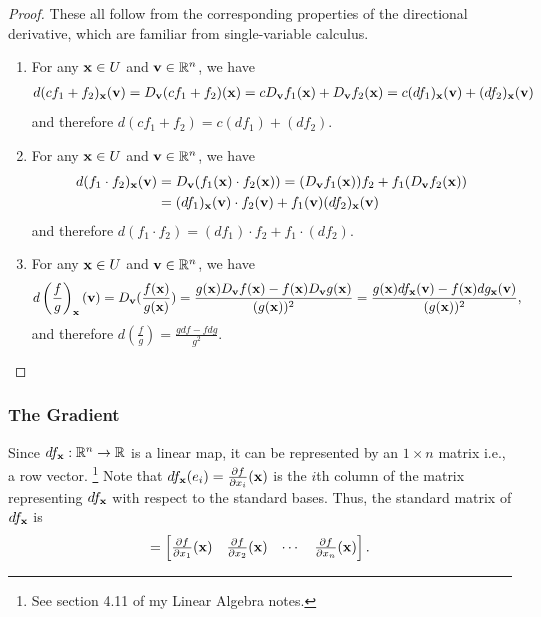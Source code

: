 \documentclass[12pt,letterpaper,reqno]{article}
\numberwithin{equation}{section}
\newcommand{\R}{\ensuremath{\mathbb R}}
\newcommand{\bv}{{\bf v}}
\newcommand{\bx}{{\bf x}}
\begin{document}
{\begin{proof}
These all follow from the corresponding properties of the directional derivative, which are familiar from single-variable calculus.
	\begin{enumerate}[(1)]
		\item For any $\bx \in U$ and $\bv \in \R^n$, we have
		\begin{align*}
			d(cf_1+f_2)_\bx(\bv)=D_\bv(cf_1+f_2)(\bx)=c D_\bv f_1(\bx)+D_\bv f_2(\bx)=c(df_1)_\bx(\bv)+(df_2)_\bx(\bv)
		\end{align*}
		and therefore $d(cf_1+f_2)=c(df_1)+(df_2)$.
		\item For any $\bx \in U$ and $\bv \in \R^n$, we have
		\begin{align*}
			d(f_1 \cdot f_2)_\bx(\bv)&=D_\bv(f_1(\bx) \cdot f_2(\bx))=(D_\bv f_1(\bx))f_2+f_1(D_\bv f_2(\bx))\\
			&=(df_1)_\bx(\bv)\cdot f_2(\bv)+f_1(\bv)(df_2)_\bx(\bv)
		\end{align*}
		and therefore $d(f_1 \cdot f_2)=(df_1) \cdot f_2+f_1 \cdot (df_2)$.
		\item For any $\bx \in U$ and $\bv \in \R^n$, we have
		\begin{align*}
			d\left(\frac{f}{g}\right)_\bx(\bv)&=D_\bv(\frac{f(\bx)}{g(\bx)})=\frac{g(\bx)D_\bv f(\bx)-f(\bx)D_\bv g(\bx)}{(g(\bx))^2}=\frac{g(\bx) df_\bx(\bv)-f(\bx)dg_\bx(\bv)}{(g(\bx))^2},
		\end{align*}
		and therefore $d\left(\frac{f}{g}\right)=\frac{g df-f dg}{g^2}$.
	\end{enumerate}
\end{proof}

\subsubsection{The Gradient}
Since $df_\bx:\R^n \to \R$ is a linear map, it can be represented by an $1 \times n$ matrix i.e., a row vector. \footnote{See section 4.11 of my Linear Algebra notes.} Note that $df_\bx(e_i)=\frac{\partial f}{\partial x_i}(\bx)$ is the $i$th column of the matrix representing $df_\bx$ with respect to the standard bases. Thus, the standard matrix of $df_\bx$ is 
\begin{align*}
	[df_\bx]=\begin{bmatrix}
		\frac{\partial f}{\partial x_1}(\bx) & \frac{\partial f}{\partial x_2}(\bx) & \cdots & \frac{\partial f}{\partial x_n}(\bx)
	\end{bmatrix}.
\end{align*}

}
\end{document}
